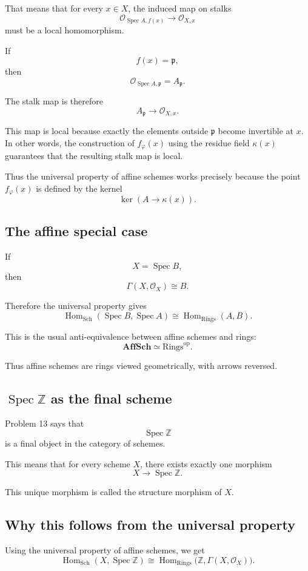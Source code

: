 \documentclass[12pt,a4paper]{article}
\DeclareMathOperator{\Hom}{Hom}
\newcommand{\AffSch}{\mathbf{AffSch}}
\newcommand{\ZZ}{\mathbb Z}
\newcommand{\OO}{\mathcal{O}}
\newcommand{\Spec}{\operatorname{Spec}}
\newcommand{\Sch}{\mathrm{Sch}}
\newcommand{\Rings}{\mathrm{Rings}}
\theoremstyle{notespace}
\begin{document}
That means that for every \(x\in X\), the induced map on stalks
\[
\OO_{\Spec A,f(x)}
\longrightarrow
\OO_{X,x}
\]
must be a local homomorphism.

If
\[
f(x)=\mathfrak p,
\]
then
\[
\OO_{\Spec A,\mathfrak p}=A_{\mathfrak p}.
\]

The stalk map is therefore
\[
A_{\mathfrak p}\to\OO_{X,x}.
\]

This map is local because exactly the elements outside \(\mathfrak p\) become invertible at \(x\). In other words, the construction of \(f_\varphi(x)\) using the residue field \(\kappa(x)\) guarantees that the resulting stalk map is local.

Thus the universal property of affine schemes works precisely because the point \(f_\varphi(x)\) is defined by the kernel
\[
\ker(A\to\kappa(x)).
\]

\subsection{The affine special case}

If
\[
X=\Spec B,
\]
then
\[
\Gamma(X,\OO_X)\cong B.
\]

Therefore the universal property gives
\[
\Hom_{\Sch}(\Spec B,\Spec A)
\cong
\Hom_{\Rings}(A,B).
\]

This is the usual anti-equivalence between affine schemes and rings:
\[
\boxed{
	\AffSch\simeq \Rings^{\mathrm{op}}.
}
\]

Thus affine schemes are rings viewed geometrically, with arrows reversed.

\subsection{\(\Spec\ZZ\) as the final scheme}

Problem 13 says that
\[
\Spec\ZZ
\]
is a final object in the category of schemes.

This means that for every scheme \(X\), there exists exactly one morphism
\[
X\to\Spec\ZZ.
\]

This unique morphism is called the structure morphism of \(X\).

\subsection{Why this follows from the universal property}

Using the universal property of affine schemes, we get
\[
\Hom_{\Sch}(X,\Spec\ZZ)
\cong
\Hom_{\Rings}\bigl(\ZZ,\Gamma(X,\OO_X)\bigr).
\]
\end{document}
